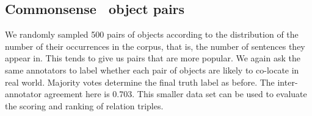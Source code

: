 \subsection{Commonsense \lnear~object pairs}
We randomly sampled 500 pairs of objects according to the distribution of
the number of their occurrences in the corpus, that is, the number of
sentences they appear in. This tends to give us pairs that are more popular.
We again ask the same annotators to label whether each pair of objects
are likely to co-locate in real world. Majority votes determine the final
truth label as before.
The inter-annotator agreement here is {0.703}. 
This smaller data set can be used to evaluate the 
scoring and ranking of relation triples.